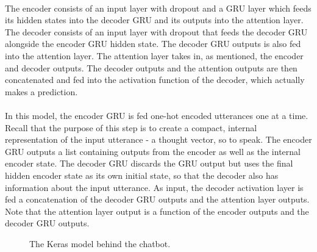 \documentclass{article}
\begin{document}
\paragraph{}
The encoder consists of an input layer with dropout and a GRU
layer which feeds its hidden states into the decoder GRU and its outputs into 
the attention layer. The decoder consists of an input layer with dropout that
feeds the decoder GRU alongside the encoder GRU hidden state. The decoder GRU
outputs is also fed into the attention layer. The attention layer takes in, as
mentioned, the encoder and decoder outputs. The decoder outputs and the
attention outputs are then concatenated and fed into the activation function of
the decoder, which actually makes a prediction.

\paragraph{}
In this model, the encoder GRU is fed one-hot encoded utterances one at a
time. Recall that the purpose of this step is to create a compact, internal
representation of the input utterance - a thought vector, so to speak. The
encoder GRU outputs a list containing outputs from the encoder as well as the
internal encoder state. The decoder GRU discards the GRU output but uses the
final hidden encoder state as its own initial state, so that the decoder also
has information about the input utterance. As input, the decoder activation
layer is fed a concatenation of the decoder GRU outputs and the attention layer
outputs. Note that the attention layer output is a function of the encoder
outputs and the decoder GRU outputs.

\begin{center}
  \begin{figure}[hbt]
    \centering
    \caption{The Keras model behind the chatbot.}
    \label{fig:keras-model}
  \end{figure}
\end{center}
\end{document}
